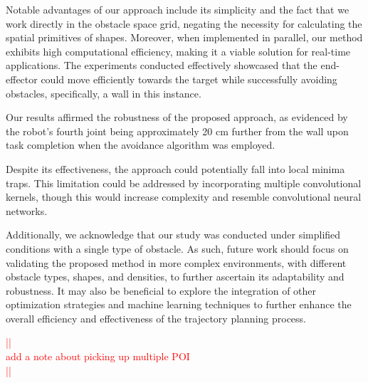 \documentclass[a4paper]{article}
\newcommand\todocomment[1]{\textcolor{red}{||\\ #1\\||}}
\begin{document}
Notable advantages of our approach include its simplicity and the fact that we work directly in the obstacle space grid, negating the necessity for calculating the spatial primitives of shapes. Moreover, when implemented in parallel, our method exhibits high computational efficiency, making it a viable solution for real-time applications. The experiments conducted effectively showcased that the end-effector could move efficiently towards the target while successfully avoiding obstacles, specifically, a wall in this instance.

Our results affirmed the robustness of the proposed approach, as evidenced by the robot's fourth joint being approximately 20 cm further from the wall upon task completion when the avoidance algorithm was employed.

Despite its effectiveness, the approach could potentially fall into local minima traps. This limitation could be addressed by incorporating multiple convolutional kernels, though this would increase complexity and resemble convolutional neural networks.

Additionally, we acknowledge that our study was conducted under simplified conditions with a single type of obstacle. As such, future work should focus on validating the proposed method in more complex environments, with different obstacle types, shapes, and densities, to further ascertain its adaptability and robustness. It may also be beneficial to explore the integration of other optimization strategies and machine learning techniques to further enhance the overall efficiency and effectiveness of the trajectory planning process.

\todocomment{add a note about picking up multiple POI}
\end{document}
